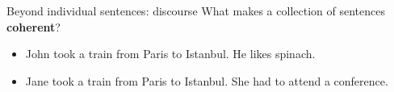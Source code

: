 \documentclass[usenames,dvipsnames,notes]{beamer}
\begin{document}
\begin{frame}
    {Beyond individual sentences: discourse}
    What makes a collection of sentences \textbf{coherent}?
    \begin{itemize}
        \item[] John took a train from Paris to Istanbul. He likes spinach.
        \item[] Jane took a train from Paris to Istanbul. She had to attend a conference.
    \end{itemize}

    \begin{center}
    \end{center}
\end{frame}
\end{document}
